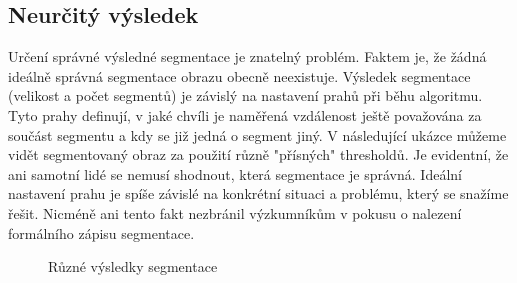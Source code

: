 \documentclass[czech, master, public, dept460, male, cpdeclaration, oneside]{diploma}
\begin{document}
\subsection{Neurčitý výsledek}
Určení správné výsledné segmentace je znatelný problém. Faktem je, že žádná ideálně správná segmentace obrazu obecně neexistuje. Výsledek segmentace (velikost a počet segmentů) je závislý na nastavení prahů při běhu algoritmu. Tyto prahy definují, v jaké chvíli je naměřená vzdálenost ještě považována za součást segmentu a kdy se již jedná o segment jiný. V následující ukázce můžeme vidět segmentovaný obraz za použití různě "přísných" thresholdů. Je evidentní, že ani samotní lidé se nemusí shodnout, která segmentace je správná. Ideální nastavení prahu je spíše závislé na konkrétní situaci a problému, který se snažíme řešit. Nicméně ani tento fakt nezbránil výzkumníkům v pokusu o nalezení formálního zápisu segmentace. \cite{Gaura}

\begin{figure}[H]
	\centering	
	\qquad	
	\caption{Různé výsledky segmentace \cite{Berkeley}}
\end{figure}
\end{document}
